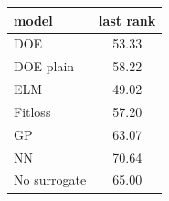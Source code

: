 \begin{tabular}{|lc|}
\hline
model & last rank\\
\hline
DOE & 53.33 \\
DOE plain & 58.22 \\
ELM & 49.02 \\
Fitloss & 57.20 \\
GP & 63.07 \\
NN & 70.64 \\
No surrogate & 65.00 \\
\hline
\end{tabular}
